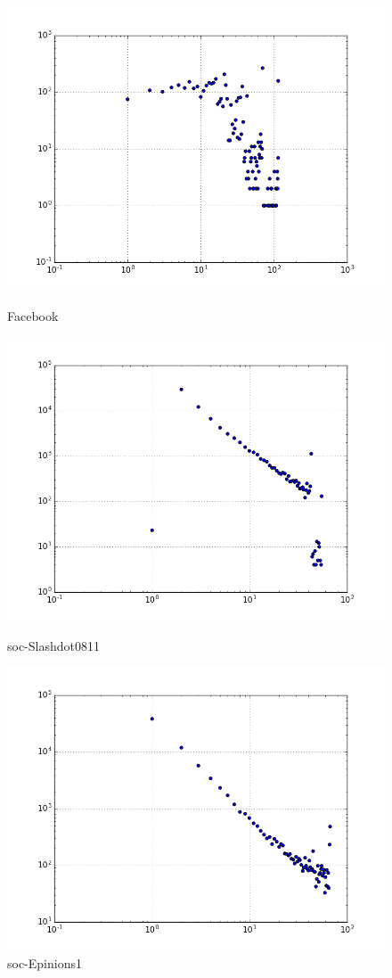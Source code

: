 \begin{figure}[H]
  \includegraphics[width=\linewidth]{img/facebook/kcore_dist.png}
  \caption*{Facebook}
\endminipage\hfill
{}
  \includegraphics[width=\linewidth]{img/slashDot/kcore_dist.png}
  \caption*{soc-Slashdot0811}
\endminipage\hfill
{}
  \includegraphics[width=\linewidth]{img/soc-E/kcore_dist.png}
  \caption*{soc-Epinions1}
\endminipage
\end{figure}
